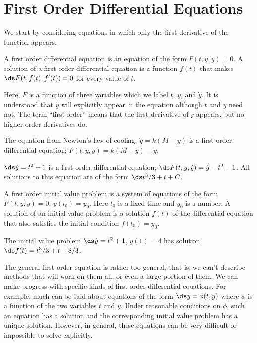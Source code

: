 \section{First Order Differential Equations}{}{}
\label{sec:first order differential equations}
\nobreak
We start by considering equations in which only the first derivative
of the function appears. 

\begin{definition} A {\dfont first order differential 
equation\/} is an equation of
the form
$F(t, y, \dot{y})=0$.
A solution of a first order differential equation is a
function $f(t)$ that makes $\ds F(t,f(t),f'(t))=0$ for every value of $t$.
\end{definition}

Here, $F$ is a function of three
variables which we label $t$, $y$, and $\dot{y}$. It is understood
that $\dot{y} $ will explicitly appear in the equation although $t$
and $y$ need not. The term ``first order'' means that the first
derivative of $y$ appears, but no higher order derivatives do.

\begin{example} The equation from Newton's law of cooling,
$\dot{y}=k(M-y)$ is a first order
differential equation; $F(t,y,\dot y)=k(M-y)-\dot y$.
\end{example}

\begin{example} $\ds\dot{y}=t^2+1$ is a first order differential
equation; $\ds F(t,y,\dot y)= \dot y-t^2-1$. All solutions to this
equation are of the form $\ds t^3/3+t+C$. 
\end{example}

\begin{definition} A {\dfont first order initial value 
problem\/} is a system of
equations of the form
$F(t, y, \dot{y})=0$, $y(t_0)=y_0$. Here $t_0 $ is a fixed time
and $y_0$ is a number.
A solution of an initial value problem is a solution $f(t)$ of
the differential equation that also satisfies the 
{\dfont initial condition\/}
$f(t_0) = y_0$.
\end{definition}

\begin{example} The initial value problem $\ds\dot{y}=t^2+1$, $y(1)=4$
has solution $\ds f(t)=t^3/3+t+8/3$.
\end{example}

The general first order equation is rather too general, that is, 
we can't describe methods that will work on them all, or even a large
portion of them. We can make progress with specific kinds of
first order differential equations.
For example, much can be said about equations of the form
$\ds \dot{y} = \phi (t, y)$ where $\phi $
is a function of the two variables $t$ and $y$.
Under reasonable conditions on $\phi$, such an
equation has a solution and the corresponding 
initial value problem has a unique solution.
However, in general, these equations can be very difficult or
impossible to solve explicitly.

